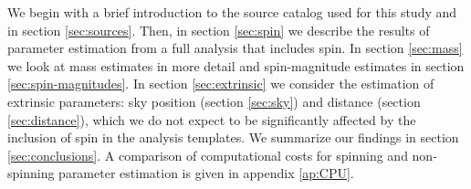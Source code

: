 We begin with a brief introduction to the source catalog used for this study and \citet{Singer_2014} in section \ref{sec:sources}. Then, in section \ref{sec:spin} we describe the results of parameter estimation from a full analysis that includes spin. In section \ref{sec:mass} we look at mass estimates in more detail and spin-magnitude estimates in section \ref{sec:spin-magnitudes}. In section \ref{sec:extrinsic} we consider the estimation of extrinsic parameters: sky position (section \ref{sec:sky}) and distance (section \ref{sec:distance}), which we do not expect to be significantly affected by the inclusion of spin in the analysis templates. We summarize our findings in section \ref{sec:conclusions}. A comparison of computational costs for spinning and non-spinning parameter estimation is given in appendix \ref{ap:CPU}.

 